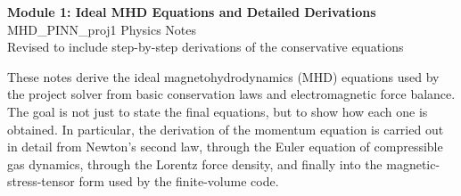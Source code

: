 \documentclass[11pt]{article}
\begin{document}
\begin{center}
    {\LARGE\bfseries Module 1: Ideal MHD Equations and Detailed Derivations}\\[0.6em]
    {\large MHD\_PINN\_proj1 Physics Notes}\\[0.4em]
    {\normalsize Revised to include step-by-step derivations of the conservative equations}
\end{center}

\vspace{0.8em}

\begin{overviewbox}
These notes derive the ideal magnetohydrodynamics (MHD) equations used by the project solver from basic conservation laws and electromagnetic force balance. The goal is not just to state the final equations, but to show how each one is obtained. In particular, the derivation of the momentum equation is carried out in detail from Newton's second law, through the Euler equation of compressible gas dynamics, through the Lorentz force density, and finally into the magnetic-stress-tensor form used by the finite-volume code.
\end{overviewbox}
\end{document}
